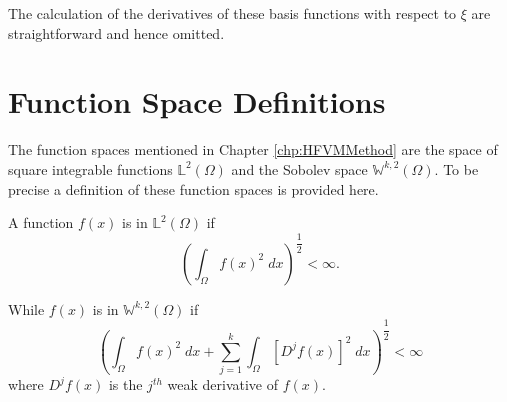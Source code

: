 The calculation of the derivatives of these basis functions with respect to $\xi$ are straightforward and hence omitted. 

\section{Function Space Definitions}
The function spaces mentioned in Chapter \ref{chp:HFVMMethod} are the space of square integrable functions $\mathbb{L}^2(\Omega)$ and the Sobolev space $\mathbb{W}^{k,2}(\Omega)$. To be precise a definition of these function spaces is provided here. 

A function $f(x)$ is in $\mathbb{L}^2(\Omega)$ if
\begin{equation*}
\left( \int_{\Omega} f(x)^2 \; dx \right)^{\dfrac{1}{2}} < \infty.
\end{equation*}

While $f(x)$ is in $\mathbb{W}^{k,2}(\Omega)$ if 
\begin{equation*}
\left( \int_{\Omega} f(x)^2 \; dx + \sum^k_{j=1}  \int_{\Omega} \left[D^j f(x) \right]^2 \; dx  \right)^{\dfrac{1}{2}} < \infty
\end{equation*}
where $D^j f(x)$ is the $j^{th}$ weak derivative of $f(x)$. 


